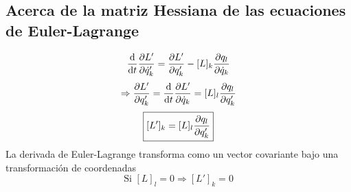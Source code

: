 \subsection{Acerca de la matriz Hessiana de las ecuaciones de Euler-Lagrange}
\begin{equation}
  \dv{t}\pdv{L'}{\dot{q}'_k}=\pdv{L'}{q'_k}-[L]_k\pdv{q_l}{\dot{q}_k}
\end{equation}
\begin{equation}
  \Rightarrow \pdv{L'}{q'_k}=\dv{t}\pdv{L'}{\dot{q}_k}=[L]_l\pdv	{q_l}{q'_k}
\end{equation}
\begin{equation}
\boxed{[L']_k=[L]_l\pdv{q_l}{q'_k}}
\end{equation}
La derivada de Euler-Lagrange transforma como un vector covariante bajo una transformación de coordenadas
\begin{equation}
  \mbox{Si }[L]_l=0 \Rightarrow [L']_k=0
\end{equation}


